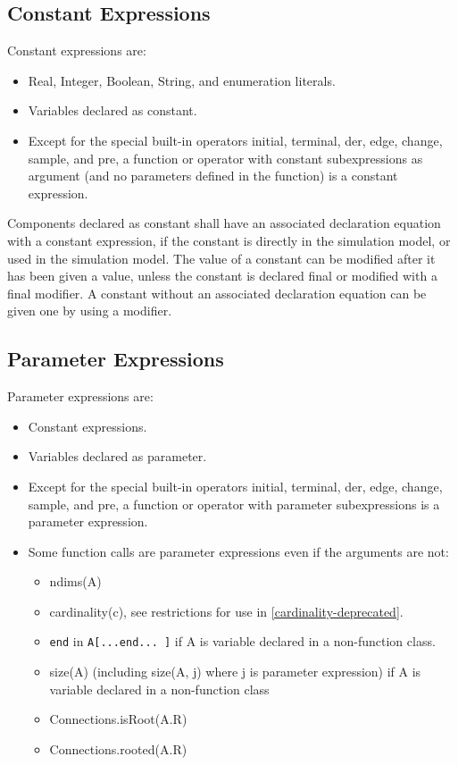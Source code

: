 \documentclass[10pt,a4paper]{report}
\def\doublelabel#1{\label{#1}}
\begin{document}
\subsection{Constant Expressions}\doublelabel{constant-expressions}

Constant expressions are:

\begin{itemize}
\item
  Real, Integer, Boolean, String, and enumeration literals.
\item
  Variables declared as constant.
\item
  Except for the special built-in operators initial, terminal, der,
  edge, change, sample, and pre, a function or operator with constant
  subexpressions as argument (and no parameters defined in the function)
  is a constant expression.
\end{itemize}

Components declared as constant shall have an associated declaration
equation with a constant expression, if the constant is directly in the
simulation model, or used in the simulation model. The value of a
constant can be modified after it has been given a value, unless the
constant is declared final or modified with a final modifier. A constant
without an associated declaration equation can be given one by using a
modifier.

\subsection{Parameter Expressions}\doublelabel{parameter-expressions}

Parameter expressions are:

\begin{itemize}
\item
  Constant expressions.
\item
  Variables declared as parameter.
\item
  Except for the special built-in operators initial, terminal, der,
  edge, change, sample, and pre, a function or operator with parameter
  subexpressions is a parameter expression.
\item
  Some function calls are parameter expressions even if the arguments
  are not:

  \begin{itemize}
  \item
    ndims(A)
  \item
    cardinality(c), see restrictions for use in \ref{cardinality-deprecated}.
  \item
    \lstinline!end! in \lstinline!A[...end... ]! if A is variable declared in a  non-function class.
  \item
    size(A) (including size(A, j) where j is parameter expression) if A
    is variable declared in a non-function class
  \item
    Connections.isRoot(A.R)
  \item
    Connections.rooted(A.R)
  \end{itemize}
\end{itemize}
\end{document}
